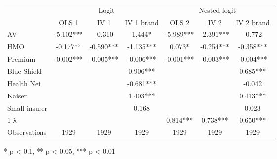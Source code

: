 \setlength{\LTpost}{0mm}
\begin{longtable}{lcccccc}
\toprule
 & \multicolumn{3}{c}{Logit} & \multicolumn{3}{c}{Nested logit} \\ 
\cmidrule(lr){2-4} \cmidrule(lr){5-7}
  & OLS 1 & IV 1 & IV 1 brand & OLS 2 & IV 2 & IV 2 brand \\ 
\midrule\addlinespace[2.5pt]
AV & -5.102*** & -0.310 & 1.444* & -5.989*** & -2.391*** & -0.772 \\ 
HMO & -0.177** & -0.590*** & -1.135*** & 0.073* & -0.254*** & -0.358*** \\ 
Premium & -0.002*** & -0.005*** & -0.006*** & -0.001*** & -0.003*** & -0.004*** \\ 
Blue Shield &  &  & 0.906*** &  &  & 0.685*** \\ 
Health Net &  &  & -0.681*** &  &  & -0.042 \\ 
Kaiser &  &  & 1.403*** &  &  & 0.413*** \\ 
Small insurer &  &  & 0.168 &  &  & 0.023 \\ 
1-λ &  &  &  & 0.814*** & 0.738*** & 0.650*** \\ 
Observations & 1929 & 1929 & 1929 & 1929 & 1929 & 1929 \\ 
\bottomrule
\end{longtable}
\begin{minipage}{\linewidth}
* p < 0.1, ** p < 0.05, *** p < 0.01\\
\end{minipage}

